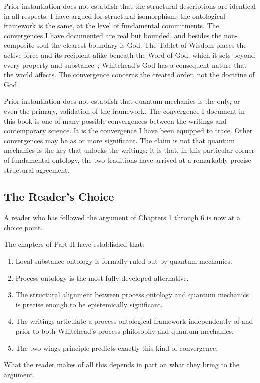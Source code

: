 Prior instantiation does not establish that the structural descriptions are
identical in all respects.
I have argued for structural isomorphism: the ontological framework is the same,
at the level of fundamental commitments.
The convergences I have documented are real but bounded, and besides the
non-composite soul the clearest boundary is God.
The Tablet of Wisdom places the active force and its recipient alike beneath the
Word of God, which it sets beyond every property and
substance~\citep{TabletsBahaullah}; Whitehead's God has a consequent nature that
the world affects.
The convergence concerns the created order, not the doctrine of God.

Prior instantiation does not establish that quantum mechanics is the only, or
even the primary, validation of the \bahai framework.
The convergence I document in this book is one of many possible convergences
between the \bahai writings and contemporary science.
It is the convergence I have been equipped to trace.
Other convergences may be as or more significant.
The claim is not that quantum mechanics is the key that unlocks the \bahai
writings; it is that, in this particular corner of fundamental ontology, the two
traditions have arrived at a remarkably precise structural agreement.

\subsection*{The Reader's Choice}

A reader who has followed the argument of Chapters 1 through 6 is now at a choice
point.

The chapters of Part II have established that:
\begin{enumerate}
\item Local substance ontology is formally ruled out by quantum mechanics.
\item Process ontology is the most fully developed alternative.
\item The structural alignment between process ontology and quantum mechanics is
precise enough to be epistemically significant.
\item The \bahai writings articulate a process ontological framework independently
of and prior to both Whitehead's process philosophy and quantum mechanics.
\item The two-wings principle predicts exactly this kind of convergence.
\end{enumerate}

What the reader makes of all this depends in part on what they bring to the
argument.

